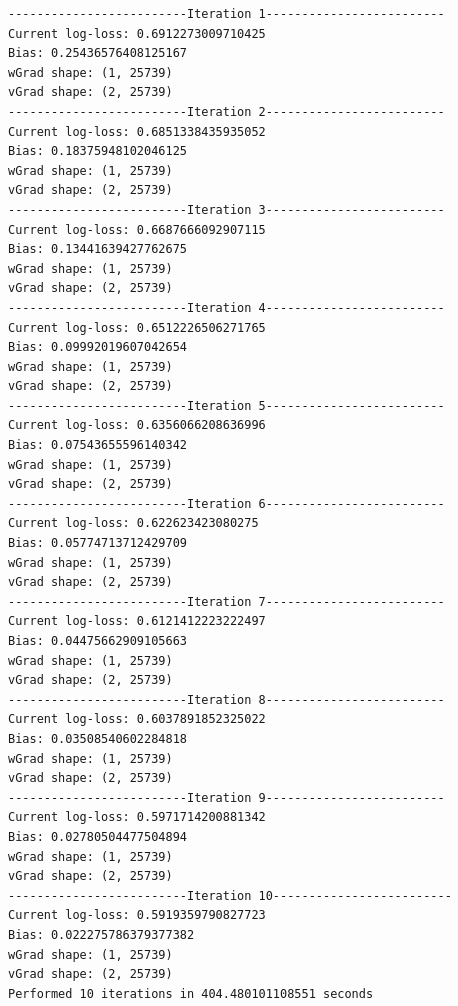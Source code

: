 \documentclass[11pt]{article}
\begin{document}
    \begin{Verbatim}[commandchars=\\\{\}]
-------------------------Iteration 1-------------------------
Current log-loss: 0.6912273009710425
Bias: 0.25436576408125167
wGrad shape: (1, 25739)
vGrad shape: (2, 25739)
-------------------------Iteration 2-------------------------
Current log-loss: 0.6851338435935052
Bias: 0.18375948102046125
wGrad shape: (1, 25739)
vGrad shape: (2, 25739)
-------------------------Iteration 3-------------------------
Current log-loss: 0.6687666092907115
Bias: 0.13441639427762675
wGrad shape: (1, 25739)
vGrad shape: (2, 25739)
-------------------------Iteration 4-------------------------
Current log-loss: 0.6512226506271765
Bias: 0.09992019607042654
wGrad shape: (1, 25739)
vGrad shape: (2, 25739)
-------------------------Iteration 5-------------------------
Current log-loss: 0.6356066208636996
Bias: 0.07543655596140342
wGrad shape: (1, 25739)
vGrad shape: (2, 25739)
-------------------------Iteration 6-------------------------
Current log-loss: 0.622623423080275
Bias: 0.05774713712429709
wGrad shape: (1, 25739)
vGrad shape: (2, 25739)
-------------------------Iteration 7-------------------------
Current log-loss: 0.6121412223222497
Bias: 0.04475662909105663
wGrad shape: (1, 25739)
vGrad shape: (2, 25739)
-------------------------Iteration 8-------------------------
Current log-loss: 0.6037891852325022
Bias: 0.03508540602284818
wGrad shape: (1, 25739)
vGrad shape: (2, 25739)
-------------------------Iteration 9-------------------------
Current log-loss: 0.5971714200881342
Bias: 0.02780504477504894
wGrad shape: (1, 25739)
vGrad shape: (2, 25739)
-------------------------Iteration 10-------------------------
Current log-loss: 0.5919359790827723
Bias: 0.022275786379377382
wGrad shape: (1, 25739)
vGrad shape: (2, 25739)
Performed 10 iterations in 404.480101108551 seconds

    \end{Verbatim}
\end{document}
